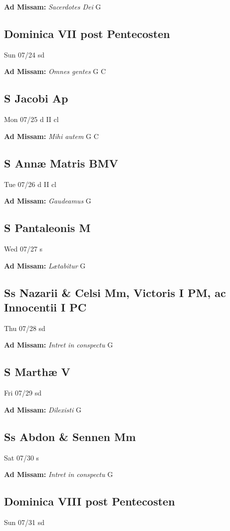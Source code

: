 \documentclass[letterpaper, 10pt, twocolumn]{article}
\begin{document}
\textbf{Ad Missam:} \textit{Sacerdotes Dei} G 

\subsection*{Dominica VII post Pentecosten}Sun 07/24 sd

\textbf{Ad Missam:} \textit{Omnes gentes} G C 

\subsection*{S Jacobi Ap}Mon 07/25 d II cl

\textbf{Ad Missam:} \textit{Mihi autem} G C 

\subsection*{S Annæ Matris BMV}Tue 07/26 d II cl

\textbf{Ad Missam:} \textit{Gaudeamus} G 

\subsection*{S Pantaleonis M}Wed 07/27 s

\textbf{Ad Missam:} \textit{Lætabitur} G 

\subsection*{Ss Nazarii \& Celsi Mm, Victoris I PM, ac Innocentii I PC}Thu 07/28 sd

\textbf{Ad Missam:} \textit{Intret in conspectu} G 

\subsection*{S Marthæ V}Fri 07/29 sd

\textbf{Ad Missam:} \textit{Dilexisti} G 

\subsection*{Ss Abdon \& Sennen Mm}Sat 07/30 s

\textbf{Ad Missam:} \textit{Intret in conspectu} G 

\subsection*{Dominica VIII post Pentecosten}Sun 07/31 sd
\end{document}
